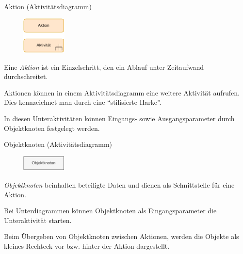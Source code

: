 \begin{diag}{Aktion (Aktivitätsdiagramm)}
    \begin{figure}
        \centering
        \includegraphics[width=0.2\textwidth]{includes/figures/defi_diagrams_activity_aktion.pdf}
    \end{figure}
    Eine \emph{Aktion} ist ein Einzelschritt, den ein Ablauf unter Zeitaufwand durchschreitet.

    Aktionen können in einem Aktivitätsdiagramm eine weitere Aktivität aufrufen.
    Dies kennzeichnet man durch eine \enquote{stilisierte Harke}.

    In diesen Unteraktivitäten können Eingangs- sowie Ausgangsparameter durch Objektknoten festgelegt werden.
\end{diag}

\begin{diag}{Objektknoten (Aktivitätsdiagramm)}
    \begin{figure}
        \centering
        \includegraphics[width=0.2\textwidth]{includes/figures/defi_diagrams_activity_objektknoten.pdf}
    \end{figure}
    \emph{Objektknoten} beinhalten beteiligte Daten und dienen als Schnittstelle für eine Aktion.

    Bei Unterdiagrammen können Objektknoten als Eingangsparameter die Unteraktivität starten.

    Beim Übergeben von Objektknoten zwischen Aktionen, werden die Objekte als kleines Rechteck vor bzw. hinter der Aktion dargestellt.
\end{diag}

